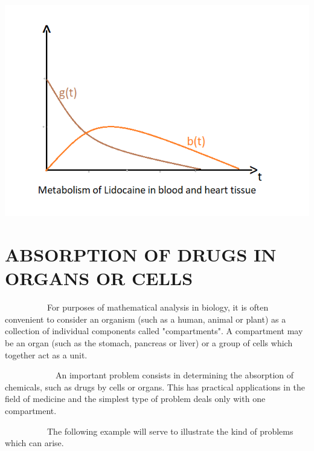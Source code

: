 
\begin{center} %
	\scalebox{1.20} %
	{\includegraphics{graph8(2).png}} %
\end{center}




\pagebreak



\section{ABSORPTION OF DRUGS IN ORGANS OR CELLS}



\par ~~~~~~~~~~For purposes of mathematical analysis in biology, it is often convenient to consider an organism (such as a human, animal or plant) as a collection of individual components called "compartments". A compartment may be an organ (such as the stomach, pancreas or liver) or a group of cells which together act as a unit. 

\par ~~~~~~~~~~~~An important problem consists in determining the absorption of chemicals, such as drugs by cells or organs. This has practical applications in the field of medicine and the simplest type of problem deals only with one compartment.

\par ~~~~~~~~~~The following example will serve to illustrate the kind of problems which can arise.

